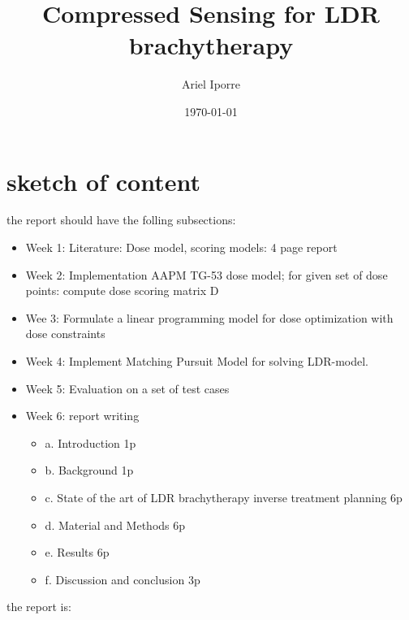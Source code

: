 \documentclass[12pt]{article}
\title{Compressed Sensing for LDR brachytherapy} %
\author{Ariel Iporre} %
\date{\today} %
\theoremstyle{definition}
\begin{document}
\maketitle %

\tableofcontents


\section{sketch of content}
the report should have the folling subsections:
\begin{itemize}
    \item Week 1: Literature: Dose model, scoring models: 4 page report
    \item Week 2: Implementation AAPM TG-53 dose model; for given set of dose points: compute dose scoring matrix D
    \item Wee 3: Formulate a linear programming model for dose optimization with dose constraints
    \item Week 4: Implement Matching Pursuit Model for solving LDR-model.
    \item Week 5: Evaluation on a set of test cases 
    \item Week 6: report writing
    \begin{itemize}
        \item a.   	Introduction 1p
        \item b.   	Background 1p
        \item c.    State of the art of LDR brachytherapy inverse treatment planning 6p
        \item d.   	Material and Methods 6p
        \item e.   	Results 6p
        \item f.    Discussion and conclusion 3p
    \end{itemize}
\end{itemize}
the report is:
\end{document}
